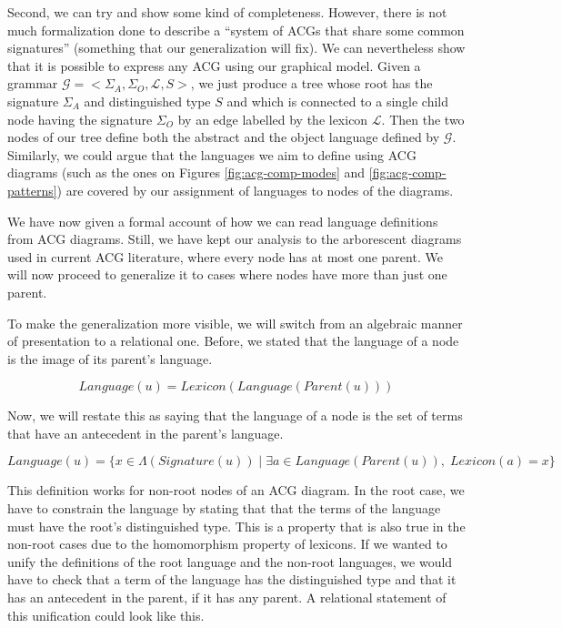 Second, we can try and show some kind of completeness. However, there is
not much formalization done to describe a ``system of ACGs that share
some common signatures'' (something that our generalization will
fix). We can nevertheless show that it is possible to express any ACG
using our graphical model. Given a grammar $\mathcal{G} =
\mathopen{<}\Sigma_A, \Sigma_O, \mathcal{L}, S\mathclose{>}$, we just
produce a tree whose root has the signature $\Sigma_A$ and distinguished
type $S$ and which is connected to a single child node having the
signature $\Sigma_O$ by an edge labelled by the lexicon
$\mathcal{L}$. Then the two nodes of our tree define both the abstract
and the object language defined by $\mathcal{G}$. Similarly, we could
argue that the languages we aim to define using ACG diagrams (such as
the ones on Figures \ref{fig:acg-comp-modes} and
\ref{fig:acg-comp-patterns}) are covered by our assignment of languages
to nodes of the diagrams.

We have now given a formal account of how we can read language
definitions from ACG diagrams. Still, we have kept our analysis to the
arborescent diagrams used in current ACG literature, where every node
has at most one parent. We will now proceed to generalize it to cases
where nodes have more than just one parent.

To make the generalization more visible, we will switch from an
algebraic manner of presentation to a relational one. Before, we stated
that the language of a node is the image of its parent's language.

$$
Language(u) = Lexicon(Language(Parent(u)))
$$

Now, we will restate this as saying that the language of a node is the
set of terms that have an antecedent in the parent's language.

$$
Language(u) = \{x \in \Lambda(Signature(u)) \mid \exists a \in
Language(Parent(u)), \; Lexicon(a) = x\}
$$

This definition works for non-root nodes of an ACG diagram. In the root
case, we have to constrain the language by stating that that the terms
of the language must have the root's distinguished type. This is a
property that is also true in the non-root cases due to the homomorphism
property of lexicons. If we wanted to unify the definitions of the root
language and the non-root languages, we would have to check that a term
of the language has the distinguished type and that it has an antecedent
in the parent, if it has any parent. A relational statement of this
unification could look like this.

